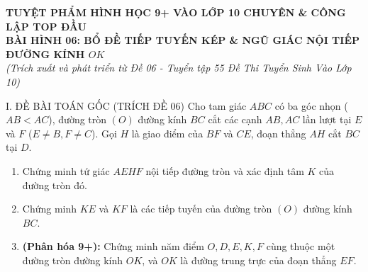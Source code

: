 \documentclass[11pt,a4paper]{article}
\begin{document}
\begin{center}
    {\Large\bfseries\color{blue!80!black} TUYỆT PHẨM HÌNH HỌC 9+ VÀO LỚP 10 CHUYÊN \& CÔNG LẬP TOP ĐẦU}\\[2mm]
    {\large\bfseries BÀI HÌNH 06: BỔ ĐỀ TIẾP TUYẾN KÉP \& NGŨ GIÁC NỘI TIẾP ĐƯỜNG KÍNH $OK$}\\[1mm]
    \textit{(Trích xuất và phát triển từ Đề 06 - Tuyển tập 55 Đề Thi Tuyển Sinh Vào Lớp 10)}
\end{center}

\vspace{1mm}

\begin{modelbox}{I. ĐỀ BÀI TOÁN GỐC (TRÍCH ĐỀ 06)}
Cho tam giác $ABC$ có ba góc nhọn ($AB < AC$), đường tròn $(O)$ đường kính $BC$ cắt các cạnh $AB, AC$ lần lượt tại $E$ và $F$ ($E \ne B, F \ne C$). Gọi $H$ là giao điểm của $BF$ và $CE$, đoạn thẳng $AH$ cắt $BC$ tại $D$.
\begin{enumerate}[label=\textbf{\alph*)}]
    \item Chứng minh tứ giác $AEHF$ nội tiếp đường tròn và xác định tâm $K$ của đường tròn đó.
    \item Chứng minh $KE$ và $KF$ là các tiếp tuyến của đường tròn $(O)$ đường kính $BC$.
    \item \textbf{(Phân hóa 9+):} Chứng minh năm điểm $O, D, E, K, F$ cùng thuộc một đường tròn đường kính $OK$, và $OK$ là đường trung trực của đoạn thẳng $EF$.
\end{enumerate}
\end{modelbox}

\vspace{1mm}
\end{document}
